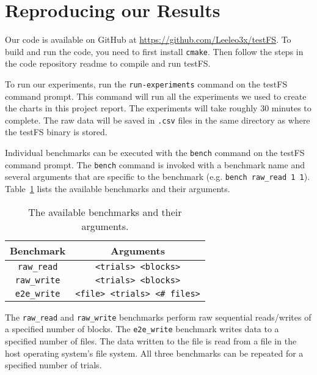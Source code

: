 \section{Reproducing our Results}
Our code is available on GitHub at \url{https://github.com/Leeleo3x/testFS}.
To build and run the code, you need to first install {\tt cmake}. Then
follow the steps in the code repository readme to compile and run testFS.

To run our experiments, run the {\tt run-experiments} command on the testFS
command prompt. This command will run all the experiments we used to create the
charts in this project report. The experiments will take roughly 30 minutes to
complete. The raw data will be saved in {\tt .csv} files in the same directory
as where the testFS binary is stored.

Individual benchmarks can be executed with the {\tt bench} command on the
testFS command prompt. The {\tt bench} command is invoked with a benchmark name
and several arguments that are specific to the benchmark (e.g. {\tt bench
  raw\_read 1 1}). Table~\ref{tbl:bench-commands} lists the available
benchmarks and their arguments.

\begin{table}[h!]
  \centering
  \caption{The available benchmarks and their arguments.}
  \label{tbl:bench-commands}
  \begin{tabular}{c|c}
    {\bf Benchmark} & {\bf Arguments} \\ \hline
    {\tt raw\_read} & {\tt <trials> <blocks>} \\ \hline
    {\tt raw\_write} & {\tt <trials> <blocks>} \\ \hline
    {\tt e2e\_write} & {\tt <file> <trials> <\# files>}
  \end{tabular}
\end{table}

The {\tt raw\_read} and {\tt raw\_write} benchmarks perform raw sequential
reads/writes of a specified number of blocks. The {\tt e2e\_write} benchmark
writes data to a specified number of files. The data written to the file is
read from a file in the host operating system's file system. All three
benchmarks can be repeated for a specified number of trials.
